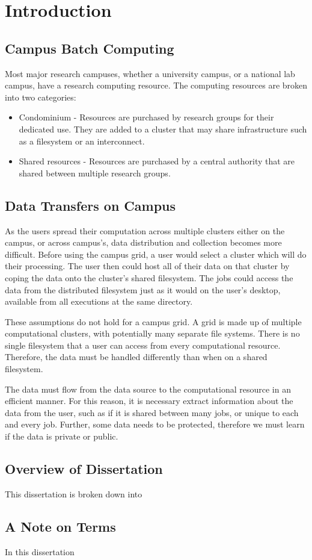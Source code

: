 \chapter{Introduction}

\section{Campus Batch Computing}

Most major research campuses, whether a university campus, or a national lab campus, have a research computing resource.  The computing resources are broken into two categories:

\begin{itemize}

\item Condominium - Resources are purchased by research groups for their dedicated use.  They are added to a cluster that may share infrastructure such as a filesystem or an interconnect.
\item Shared resources -  Resources are purchased by a central authority that are shared between multiple research groups.

\end{itemize}



\section{Data Transfers on Campus}

As the users spread their computation across multiple clusters either on the campus, or across campus's, data distribution and collection becomes more difficult.  Before using the campus grid, a user would select a cluster which will do their processing.  The user then could host all of their data on that cluster by coping the data onto the cluster's shared filesystem.  The jobs could access the data from the distributed filesystem just as it would on the user's desktop, available from all executions at the same directory.

These assumptions do not hold for a campus grid.  A grid is made up of multiple computational clusters, with potentially many separate file systems.  There is no single filesystem that a user can access from every computational resource.  Therefore, the data must be handled differently than when on a shared filesystem.  

The data must flow from the data source to the computational resource in an efficient manner.  For this reason, it is necessary extract information about the data from the user, such as if it is shared between many jobs, or unique to each and every job.  Further, some data needs to be protected, therefore we must learn if the data is private or public.


\section{Overview of Dissertation}

This dissertation is broken down into 



\section{A Note on Terms}

In this dissertation 

